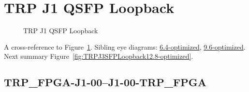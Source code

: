 

% 

\section{TRP J1 QSFP Loopback}\label{sec:TRPJ1QSFPLoopback12.8-optimized}

\begin{figure}[h] %
\begin{subfigure}{0.5\textwidth}
\hyperref[sec:TRPFPGAJ100J100TRPFPGA12.8-optimized]{}
\end{subfigure}\hspace*{\fill}
\begin{subfigure}{0.5\textwidth}
\hyperref[sec:TRPFPGAJ101J101TRPFPGA12.8-optimized]{}
\end{subfigure}

\begin{subfigure}{0.5\textwidth}
\hyperref[sec:TRPFPGAJ102J102TRPFPGA12.8-optimized]{}
\end{subfigure}\hspace*{\fill}
\begin{subfigure}{0.5\textwidth}
\hyperref[sec:TRPFPGAJ103J103TRPFPGA12.8-optimized]{}
\end{subfigure}

\caption{TRP J1 QSFP Loopback} \label{fig:TRPJ1QSFPLoopback12.8-optimized}
\end{figure}

A cross-reference to Figure~\ref{fig:TRPJ1QSFPLoopback12.8-optimized}.
Sibling eye diagrams: \hyperref[sec:TRPJ1QSFPLoopback6.4-optimized]{6.4-optimized}, \hyperref[sec:TRPJ1QSFPLoopback9.6-optimized]{9.6-optimized}. \\
Next summary Figure~\ref{fig:TRPJ3SFPLoopback12.8-optimized}.
\clearpage
% 
\subsection{TRP\_FPGA-J1-00--J1-00-TRP\_FPGA}\label{sec:TRPFPGAJ100J100TRPFPGA12.8-optimized}

